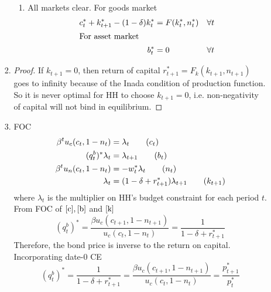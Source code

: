 \documentclass{article}
\begin{document}
\begin{enumerate}
\begin{enumerate}
\begin{enumerate}
\begin{enumerate}[label=\arabic*)]
                    \item All markets clear. For goods market 
                    \begin{align*}
                        c_{t}^\ast+k_{t+1}^\ast-(1-\delta)k_t^\ast&=F(k_t^\ast,n_t^\ast)&\forall t\\
                        \intertext{For asset market}
                        b_{t}^\ast&=0&\forall t
                    \end{align*}
                \end{enumerate}
                \item 
                \begin{proof}
                    If \(k_{t+1}=0\), then return of capital \(r_{t+1}^\ast=F_k(k_{t+1},n_{t+1})\) goes to infinity because of the Inada condition of production function.
                    So it is never optimal for HH to choose \(k_{t+1}=0\), i.e. non-negativity of capital will not bind in equilibrium.
                \end{proof}
                \item FOC
                \begin{align}
                    \beta^tu_c(c_t,1-n_t)&=\lambda_{t}\tag{$c_{t}$}\label{c}\\
                    (q_{t}^b)^\ast\lambda_{t}&=\lambda_{t+1}\tag{$b_{t}$}\label{b}\\
                    \beta^tu_n(c_t,1-n_t)&=-w_t^\ast\lambda_{t}\tag{$n_{t}$}\label{n}\\
                    \lambda_{t}&=(1-\delta+r_{t+1}^\ast)\lambda_{t+1}\tag{$k_{t+1}$}\label{k}
                \end{align}
                where $\lambda_{t}$ is the multiplier on HH's budget constraint for each period $t$.\\
                From FOC of \(\eqref{c},\eqref{b}\) and \(\eqref{k}\)
                \begin{equation}
                    (q_{t}^b)^\ast=\frac{\beta u_c(c_{t+1},1-n_{t+1})}{u_c(c_t,1-n_t)}=\frac{1}{1-\delta+r_{t+1}^\ast}\label{q}
                \end{equation}
                Therefore, the bond price is inverse to the return on capital.\\
                Incorporating date-0 CE
                \begin{equation*}
                    (q_{t}^b)^\ast=\frac{1}{1-\delta+r_{t+1}^\ast}=\frac{\beta u_c(c_{t+1},1-n_{t+1})}{u_c(c_t,1-n_t)}=\frac{p_{t+1}^\ast}{p_t^\ast}

\end{equation*}
\end{enumerate}
\end{enumerate}
\end{enumerate}
\end{document}
